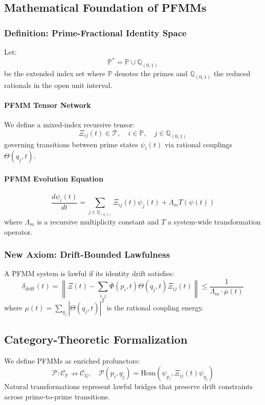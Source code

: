 \documentclass{article}
\theoremstyle{plain}
\begin{document}
\subsection{Mathematical Foundation of PFMMs}
\subsubsection{Definition: Prime-Fractional Identity Space}
Let:
\[
\mathbb{P}^* = \mathbb{P} \cup \mathbb{Q}_{(0,1)}
\]
be the extended index set where \(\mathbb{P}\) denotes the primes and \(\mathbb{Q}_{(0,1)}\) the reduced rationals in the open unit interval.

\paragraph{PFMM Tensor Network}
We define a mixed-index recursive tensor:
\[
\Xi_{ij}(t) \in \mathcal{T}, \quad i \in \mathbb{P}, \quad j \in \mathbb{Q}_{(0,1)}
\]
governing transitions between prime states \(\psi_i(t)\) via rational couplings \(\Theta(q_j, t)\).

\paragraph{PFMM Evolution Equation}
\[
\frac{d\psi_i(t)}{dt} = \sum_{j \in \mathbb{Q}_{(0,1)}} \Xi_{ij}(t) \psi_j(t) + \Lambda_m T(\psi(t))
\]
where \(\Lambda_m\) is a recursive multiplicity constant and \(T\) a system-wide transformation operator.

\subsubsection{New Axiom: Drift-Bounded Lawfulness}
\begin{axiom}
A PFMM system is lawful if its identity drift satisfies:
\[
\delta_{\text{drift}}(t) = \left\| \Xi(t) - \sum_{i,j} \Phi(p_i,t)\Theta(q_j,t)\Xi_{ij}(t) \right\| \leq \frac{1}{\Lambda_m \cdot \mu(t)}
\]
where \(\mu(t) = \sum_{q_j} |\Theta(q_j,t)|^2\) is the rational coupling energy.
\end{axiom}

\subsection{Category-Theoretic Formalization}
We define PFMMs as enriched profunctors:
\[
\mathcal{P} : \mathcal{C}_{\mathbb{P}} \nrightarrow \mathcal{C}_{\mathbb{Q}}, \quad \mathcal{P}(p_i, q_j) = \text{Hom}(\psi_{p_i}, \Xi_{ij}(t) \psi_{q_j})
\]
Natural transformations represent lawful bridges that preserve drift constraints across prime-to-prime transitions.
\end{document}
